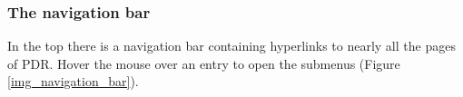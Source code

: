 \subsubsection{The navigation bar}
In the top there is a navigation bar containing hyperlinks to nearly all the pages of PDR. Hover the mouse over an entry to open the submenus (Figure \ref{img_navigation_bar}).
\begin{multicols}{3}
\begin{description}
    \item {}
    \begin{description}
        \item {}
        \item {}
    \end{description}
    \item {}
    \begin{description}
    \item {}
    \item {}
    \item {}
    \end{description}
    \columnbreak
    \item {}
    \begin{description}
    \item {}
    \item {}
    \end{description}
    \item {}
    \begin{description}
    \item {}
    \item {}
    \item {}
    \end{description}
    \item {}
    \begin{description}
    \item {}
    \item {}
    \item {}
    \end{description}
    \columnbreak
    \item {}

\end{description}
\end{multicols}
